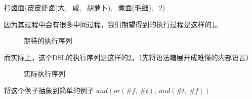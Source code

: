 \begin{flushleft}
	打卤面(皮皮虾卤(大,~ 咸,~ 胡萝卜),~ 煮面(毛细),~ 2)
\end{flushleft}

因为其过程中会有很多中间过程，我们期望得到的执行过程是这样的\ref{fig:expect}。
\begin{figure}[H]
	\begin{center}
	\end{center}
	\caption{期待的执行序列}
	\label{fig:expect}
\end{figure}


而实际上，这个DSL的执行序列是这样的\ref{fig:fact}。（先将语法糖展开成难懂的内部语言）
\begin{figure}[H]
	\begin{center}
	\end{center}
	\caption{实际执行序列}
	\label{fig:fact}
\end{figure}


将这个例子抽象到简单的例子
	$and(or(\#f,~\#t),~and(\#t,~\#f))$

